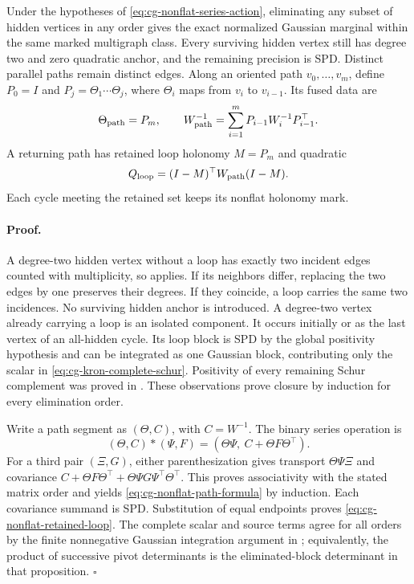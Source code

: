 Under the hypotheses of \eqref{eq:cg-nonflat-series-action},
eliminating any subset of hidden vertices in any order gives the
exact normalized Gaussian marginal within the same marked
multigraph class. Every surviving hidden vertex still has degree
two and zero quadratic anchor, and the remaining precision is SPD.
Distinct parallel paths remain distinct edges. Along an oriented
path \(v_0,\ldots,v_m\), define
\(P_0=I\) and \(P_j=\Theta_1\cdots\Theta_j\), where
\(\Theta_i\) maps from \(v_i\) to \(v_{i-1}\). Its fused data are
\begin{equation}
\Theta_{\rm path}=P_m,\qquad
W_{\rm path}^{-1}
=\sum_{i=1}^m P_{i-1}W_i^{-1}P_{i-1}^\top.
\label{eq:cg-nonflat-path-formula}
\end{equation}
A returning path has retained loop holonomy \(M=P_m\) and quadratic
\begin{equation}
Q_{\rm loop}=(I-M)^\top W_{\rm path}(I-M).
\label{eq:cg-nonflat-retained-loop}
\end{equation}
Each cycle meeting the retained set keeps its nonflat holonomy mark.

\paragraph{Proof.}
A degree-two hidden vertex without a loop has exactly two incident
edges counted with multiplicity, so
 applies. If its neighbors differ,
replacing the two edges by one preserves their degrees. If they
coincide, a loop carries the same two incidences. No surviving
hidden anchor is introduced. A degree-two vertex already carrying
a loop is an isolated component. It occurs initially or as the
last vertex of an all-hidden cycle. Its loop block is SPD by the
global positivity hypothesis and can be integrated as one Gaussian
block, contributing only the scalar in
\eqref{eq:cg-kron-complete-schur}. Positivity of every remaining
Schur complement was proved in
. These observations prove
closure by induction for every elimination order.

Write a path segment as \((\Theta,C)\), with \(C=W^{-1}\).
The binary series operation is
\begin{equation}
(\Theta,C)*(\Psi,F)
=(\Theta\Psi,\ C+\Theta F\Theta^\top).
\label{eq:cg-nonflat-series-composition}
\end{equation}
For a third pair \((\Xi,G)\), either parenthesization gives
transport \(\Theta\Psi\Xi\) and covariance
\(C+\Theta F\Theta^\top+\Theta\Psi G\Psi^\top\Theta^\top\).
This proves associativity with the stated matrix order and yields
\eqref{eq:cg-nonflat-path-formula} by induction. Each covariance
summand is SPD. Substitution of equal endpoints proves
\eqref{eq:cg-nonflat-retained-loop}. The complete scalar and source
terms agree for all orders by the finite nonnegative Gaussian
integration argument in
; equivalently, the product
of successive pivot determinants is the eliminated-block
determinant in that proposition. \(\square\)

